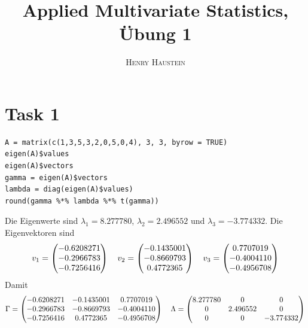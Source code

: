 \documentclass{article}
\title{\textbf{Applied Multivariate Statistics, Übung 1}}
\author{\textsc{Henry Haustein}}
\date{}
\begin{document}
	\maketitle
	
	\section*{Task 1}
	\begin{lstlisting}
A = matrix(c(1,3,5,3,2,0,5,0,4), 3, 3, byrow = TRUE)
eigen(A)$values
eigen(A)$vectors
gamma = eigen(A)$vectors
lambda = diag(eigen(A)$values)
round(gamma %*% lambda %*% t(gamma))
	\end{lstlisting}
	Die Eigenwerte sind $\lambda_1 = 8.277780$, $\lambda_2 = 2.496552$ und $\lambda_3 = -3.774332$. Die Eigenvektoren sind
	\begin{align}
		v_1 = \begin{pmatrix}
			-0.6208271 \\ -0.2966783 \\ -0.7256416
		\end{pmatrix} \quad v_2 = \begin{pmatrix}
			-0.1435001 \\ -0.8669793 \\ 0.4772365
		\end{pmatrix} \quad v_3 = \begin{pmatrix}
			0.7707019 \\ -0.4004110 \\ -0.4956708
		\end{pmatrix} \notag
	\end{align}
	Damit
	\begin{align}
		\Gamma = \begin{pmatrix}
			-0.6208271 & -0.1435001 & 0.7707019 \\ 
			-0.2966783 & -0.8669793 & -0.4004110 \\ 
			-0.7256416 & 0.4772365 & -0.4956708
		\end{pmatrix} \quad \Lambda = \begin{pmatrix}
			8.277780 & 0 & 0 \\
			0 & 2.496552 & 0 \\
			0 & 0 & -3.774332
		\end{pmatrix} \notag
	\end{align}
\end{document}

